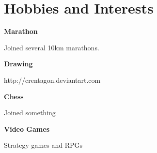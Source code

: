 \section*{Hobbies and Interests}

\speciallinebreak
\begin{multicols}{2}

\begin{description}
	\item {\color{special-color}\textbf{Marathon}}
    \item Joined several 10km marathons.
\end{description}

\begin{description}
	\item {\color{special-color}\textbf{Drawing}}
    \item http://crentagon.deviantart.com
\end{description}

\begin{description}
	\item {\color{special-color}\textbf{Chess}}
    \item Joined something
\end{description}

\begin{description}
	\item {\color{special-color}\textbf{Video Games}}
    \item Strategy games and RPGs
\end{description}

\end{multicols}

